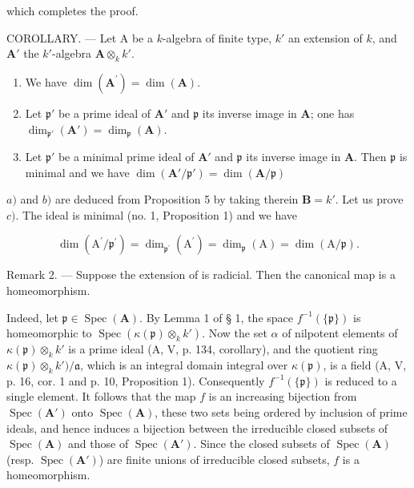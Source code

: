 which completes the proof.

COROLLARY. --- Let A be a \(k\)-algebra of finite type, \(k'\) an extension of \(k\), and \(\mathbf{A}'\) the \(k'\)-algebra \(\mathbf{A} \otimes_k k'\).

\begin{enumerate}
\def\labelenumi{\alph{enumi})}
\item
  We have \(\dim (\mathbf{A}^{\prime}) = \dim (\mathbf{A})\).
\item
  Let \(\mathfrak{p}'\) be a prime ideal of \(\mathbf{A}'\) and \(\mathfrak{p}\) its inverse image in \(\mathbf{A}\); one has \(\dim_{\mathfrak{p}'}(\mathbf{A}') = \dim_{\mathfrak{p}}(\mathbf{A})\).
\item
  Let \(\mathfrak{p}'\) be a minimal prime ideal of \(\mathbf{A}'\) and \(\mathfrak{p}\) its inverse image in \(\mathbf{A}\). Then \(\mathfrak{p}\) is minimal and we have \(\dim(\mathbf{A}'/\mathfrak{p}') = \dim(\mathbf{A}/\mathfrak{p})\)
\end{enumerate}

\(a)\) and \(b)\) are deduced from Proposition 5 by taking therein \(\mathbf{B} = k'\). Let us prove \(c)\). The ideal  is minimal (no. 1, Proposition 1) and we have

\[
\dim (\mathrm{A} ^ {\prime} / \mathfrak {p} ^ {\prime}) = \dim_ {\mathfrak {p} ^ {\prime}} (\mathrm{A} ^ {\prime}) = \dim_ {\mathfrak {p}} (\mathrm{A}) = \dim (\mathrm{A} / \mathfrak {p}).
\]

Remark 2. --- Suppose the extension  of  is radicial. Then the canonical map  is a homeomorphism.

Indeed, let \(\mathfrak{p} \in \operatorname{Spec}(\mathbf{A})\). By Lemma 1 of § 1, the space \(f^{-1}(\{\mathfrak{p}\})\) is homeomorphic to \(\operatorname{Spec}(\kappa(\mathfrak{p}) \otimes_k k')\). Now the set \(\alpha\) of nilpotent elements of \(\kappa(\mathfrak{p}) \otimes_k k'\) is a prime ideal (A, V, p. 134, corollary), and the quotient ring \(\kappa(\mathfrak{p}) \otimes_k k')/\mathfrak{a}\), which is an integral domain integral over \(\kappa(\mathfrak{p})\), is a field (A, V, p. 16, cor. 1 and p. 10, Proposition 1). Consequently \(f^{-1}(\{\mathfrak{p}\})\) is reduced to a single element. It follows that the map \(f\) is an increasing bijection from \(\operatorname{Spec}(\mathbf{A}')\) onto \(\operatorname{Spec}(\mathbf{A})\), these two sets being ordered by inclusion of prime ideals, and hence induces a bijection between the irreducible closed subsets of \(\operatorname{Spec}(\mathbf{A})\) and those of \(\operatorname{Spec}(\mathbf{A}')\). Since the closed subsets of \(\operatorname{Spec}(\mathbf{A})\) (resp. \(\operatorname{Spec}(\mathbf{A}')\)) are finite unions of irreducible closed subsets, \(f\) is a homeomorphism.

